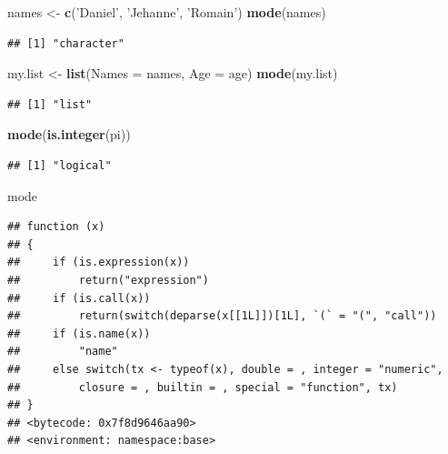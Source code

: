 \documentclass[]{book}
\newenvironment{Shaded}{\begin{snugshade}}{\end{snugshade}}
\newcommand{\DataTypeTok}[1]{\textcolor[rgb]{0.13,0.29,0.53}{#1}}
\newcommand{\KeywordTok}[1]{\textcolor[rgb]{0.13,0.29,0.53}{\textbf{#1}}}
\newcommand{\NormalTok}[1]{#1}
\newcommand{\StringTok}[1]{\textcolor[rgb]{0.31,0.60,0.02}{#1}}
\begin{document}
\begin{Shaded}
\begin{Highlighting}[]
\NormalTok{names <-}\StringTok{ }\KeywordTok{c}\NormalTok{(}\StringTok{'Daniel'}\NormalTok{, }\StringTok{'Jehanne'}\NormalTok{, }\StringTok{'Romain'}\NormalTok{)}
\KeywordTok{mode}\NormalTok{(names)}
\end{Highlighting}
\end{Shaded}

\begin{verbatim}
## [1] "character"
\end{verbatim}

\begin{Shaded}
\begin{Highlighting}[]
\NormalTok{my.list <-}\StringTok{ }\KeywordTok{list}\NormalTok{(}\DataTypeTok{Names =}\NormalTok{ names, }\DataTypeTok{Age =}\NormalTok{ age)}
\KeywordTok{mode}\NormalTok{(my.list)}
\end{Highlighting}
\end{Shaded}

\begin{verbatim}
## [1] "list"
\end{verbatim}

\begin{Shaded}
\begin{Highlighting}[]
\KeywordTok{mode}\NormalTok{(}\KeywordTok{is.integer}\NormalTok{(pi))}
\end{Highlighting}
\end{Shaded}

\begin{verbatim}
## [1] "logical"
\end{verbatim}

\begin{Shaded}
\begin{Highlighting}[]
\NormalTok{mode}
\end{Highlighting}
\end{Shaded}

\begin{verbatim}
## function (x) 
## {
##     if (is.expression(x)) 
##         return("expression")
##     if (is.call(x)) 
##         return(switch(deparse(x[[1L]])[1L], `(` = "(", "call"))
##     if (is.name(x)) 
##         "name"
##     else switch(tx <- typeof(x), double = , integer = "numeric", 
##         closure = , builtin = , special = "function", tx)
## }
## <bytecode: 0x7f8d9646aa90>
## <environment: namespace:base>
\end{verbatim}
\end{document}
